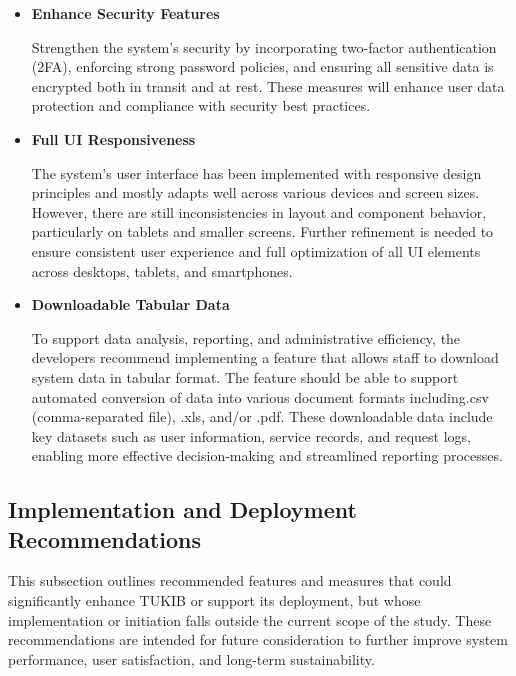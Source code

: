 \begin{itemize}
	\item \textbf{Enhance Security Features}
	
	Strengthen the system’s security by incorporating two-factor authentication (2FA), enforcing strong password policies, and ensuring all sensitive data is encrypted both in transit and at rest. These measures will enhance user data protection and compliance with security best practices.
	
	\item \textbf{Full UI Responsiveness}
	
	The system’s user interface has been implemented with responsive design principles and mostly adapts well across various devices and screen sizes. However, there are still inconsistencies in layout and component behavior, particularly on tablets and smaller screens. Further refinement is needed to ensure consistent user experience and full optimization of all UI elements across desktops, tablets, and smartphones.
	
	\item \textbf{Downloadable Tabular Data}
	
	To support data analysis, reporting, and administrative efficiency, the developers recommend implementing a feature that allows staff to download system data in tabular format. The feature should be able to support automated conversion of data into various document formats including.csv (comma-separated file), .xls,	and/or .pdf. These downloadable data include key datasets such as user information, service records, and request logs, enabling more effective decision-making and streamlined reporting processes.
	
\end{itemize}

\subsection{Implementation and Deployment Recommendations}

This subsection outlines recommended features and measures that could significantly enhance TUKIB or support its deployment, but whose implementation or initiation falls outside the current scope of the study. These recommendations are intended for future consideration to further improve system performance, user satisfaction, and long-term sustainability.

